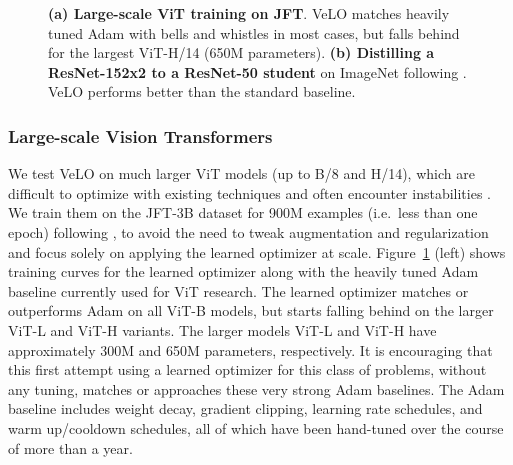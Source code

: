 \documentclass[11pt]{article}
\begin{document}
\begin{figure}[t]
    \caption{\textbf{(a) Large-scale ViT training on JFT}. VeLO matches heavily tuned Adam with bells and whistles in most cases, but falls behind for the largest ViT-H/14 (650M parameters). \textbf{(b) Distilling a ResNet-152x2 to a ResNet-50 student} on ImageNet following \citet{distillation_ours}.
    VeLO performs better than the standard baseline.
    \label{fig:vit_jft4b}
    }
\end{figure}

\subsubsection{Large-scale Vision Transformers}
We test VeLO on much larger ViT models (up to B/8 and H/14), which are difficult to optimize with existing techniques and often encounter instabilities \citep{mocov3}.
We train them on the JFT-3B dataset for 900M examples (i.e.\ less than one epoch) following \citet{zhai2022scaling}, to avoid the need to tweak augmentation and regularization and focus solely on applying the learned optimizer at scale.
Figure~\ref{fig:vit_jft4b} (left) shows training curves for the learned optimizer along with the heavily tuned Adam baseline
currently used for ViT research.
The learned optimizer matches or outperforms Adam on all ViT-B models, but starts falling behind on the larger ViT-L and ViT-H variants. 
The larger models ViT-L and ViT-H have approximately 300M and 650M parameters, respectively.
It is encouraging that this first attempt using a learned optimizer for this class of problems, without any tuning, matches or approaches these very strong Adam baselines. The Adam baseline includes weight decay, gradient clipping, learning rate schedules, and warm up/cooldown schedules, all of which have been hand-tuned over the course of more than a year.
\end{document}
